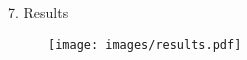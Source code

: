 



7. Results 
\begin{figure}[h!] %
  \begin{center}
    \texttt{[image: images/results.pdf]}
 \end{center}
\end{figure} 

